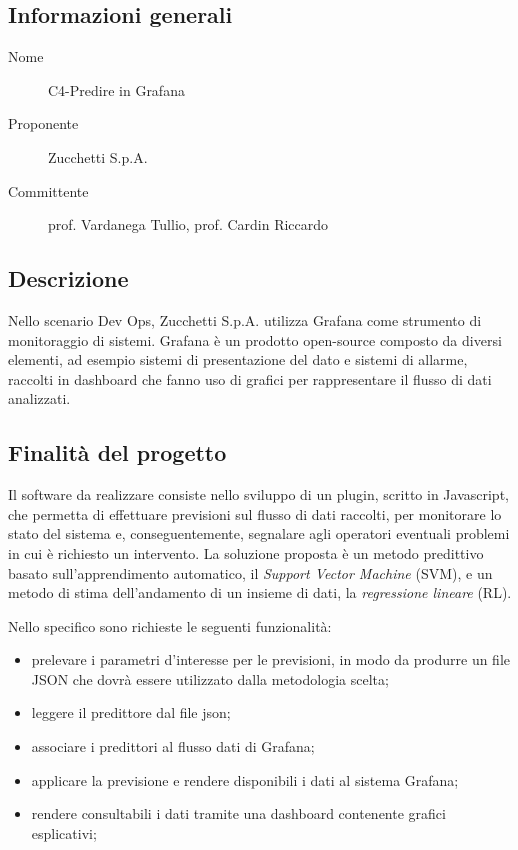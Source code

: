 \documentclass[../studio-di-fattibilita.tex]{subfiles}
\begin{document}
  \subsection{Informazioni generali}%
  \label{subsec:informazioni_generali}
  \begin{description}
    \item[Nome] C4-Predire in Grafana
    \item[Proponente] Zucchetti S.p.A.
    \item[Committente] prof. Vardanega Tullio, prof. Cardin Riccardo
  \end{description}


  \subsection{Descrizione}%
  \label{subsec:descrizione}
  Nello scenario Dev Ops, Zucchetti S.p.A. utilizza Grafana come strumento di monitoraggio di sistemi.
  Grafana è un prodotto open-source composto da diversi elementi, ad esempio sistemi di presentazione del dato e sistemi di allarme, raccolti in dashboard che fanno uso di grafici per rappresentare il flusso di dati analizzati.


  \subsection{Finalità del progetto}%
  \label{subsec:finalita_del_progetto}
  Il software da realizzare consiste nello sviluppo di un plugin, scritto in Javascript, che permetta di effettuare previsioni sul flusso di dati raccolti, per monitorare lo stato del sistema e, conseguentemente, segnalare agli operatori eventuali problemi in cui è richiesto un intervento. La soluzione proposta è un metodo predittivo basato sull'apprendimento automatico, il \textit{Support Vector Machine} (SVM), e un metodo di stima dell'andamento di un insieme di dati, la \textit{regressione lineare} (RL).

  Nello specifico sono richieste le seguenti funzionalità:
  \begin{itemize}
    \item prelevare i parametri d'interesse per le previsioni, in modo da produrre un file JSON che dovrà essere utilizzato dalla metodologia scelta;
    \item leggere il predittore dal file json;
    \item associare i predittori al flusso dati di Grafana;
    \item applicare la previsione e rendere disponibili i dati al sistema Grafana;
    \item rendere consultabili i dati tramite una dashboard contenente grafici esplicativi;
  \end{itemize}
\end{document}
